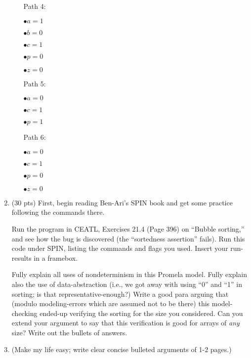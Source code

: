 \documentclass[11pt]{article}
\begin{document}
\begin{enumerate}
\begin{enumerate}
\begin{minipage}{\minpagw}
{{    \hfill
    
    Path 4:
    
    $\bullet a = 1$
    
    $\bullet b = 0$
    
    $\bullet c = 1$
    
    $\bullet p = 0$
    
    $\bullet z = 0$
    
    \hfill
    
    Path 5:
    
    $\bullet a = 0$
    
    $\bullet c = 1$
    
    $\bullet p = 1$
    
    \hfill
    
    Path 6:
    
    $\bullet a = 0$
    
    $\bullet c = 1$
    
    $\bullet p = 0$
    
    $\bullet z = 0$
    }%
  }%
\end{minipage}
  \end{enumerate}

  \clearpage
  
 
\item (30 pts) First, begin reading Ben-Ari's SPIN book and get some practice
  following the commands there.

  Run the program in CEATL, Exercises
  21.4 (Page 396) on ``Bubble sorting,'' and see how the bug is discovered
  (the ``sortedness assertion'' fails).
  Run this code under SPIN, listing the commands and flags you used.
  Insert your run-results in a framebox.
  
  Fully explain all uses of nondeterminism in this Promela model.
  Fully explain also the use of data-abstraction (i.e., we got away with
  using ``0'' and ``1'' in sorting; is that representative-enough?)
  Write a good para arguing that (modulo modeling-errors which are assumed
  not to be there) this model-checking ended-up verifying the sorting for the size
  you considered.
  Can you extend your argument to say that this verification is good for
  arrays of {\em any} size? Write out the bullets of answers.
  
  \item[] (Make my life easy; write clear concise bulleted arguments of 1-2 pages.)
  

\end{enumerate}
\end{document}
